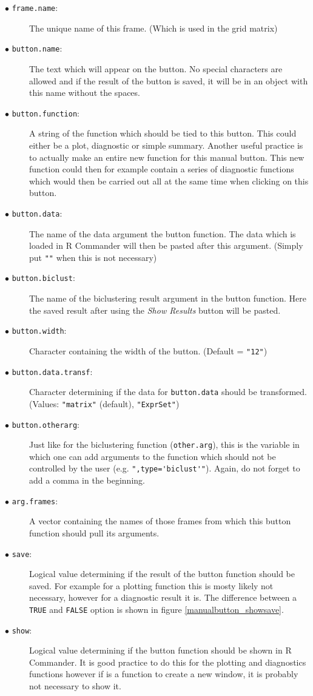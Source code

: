 \documentclass[a4paper]{article}\usepackage[]{graphicx}\usepackage[]{color}
\begin{document}
\begin{description}
  \item[$\bullet$ \texttt{frame.name}:] The unique name of this frame. (Which is used in the grid matrix)
  \item[$\bullet$ \texttt{button.name}:] The text which will appear on the
  button. No special characters are allowed and if the result of the button is
  saved, it will be in an object with this name without the spaces.
  \item[$\bullet$ \texttt{button.function}:] A string of the function which
  should be tied to this button. This could either be a plot, diagnostic or
  simple summary. Another useful practice is to actually make an entire
  new function for this manual button. This new function could then for
  example contain a series of diagnostic functions which would then be carried
  out all at the same time when clicking on this button.
  \item[$\bullet$ \texttt{button.data}:] The name of the data argument the
  button function. The data which is loaded in R Commander will then be
  pasted after this argument. (Simply put \verb|""| when this is not necessary)
  \item[$\bullet$ \texttt{button.biclust}:] The name of the biclustering result
  argument in the button function. Here the saved result after using the {\it
  Show Results} button will be pasted.
  \item[$\bullet$ \texttt{button.width}:] Character containing the width of the
  button. (Default = \verb|"12"|)
  \item[$\bullet$ \texttt{button.data.transf}:] Character determining if the
  data for \verb|button.data| should be transformed. (Values: \verb|"matrix"|
  (default), \verb|"ExprSet"|)
  \item[$\bullet$ \texttt{button.otherarg}:] Just like for the biclustering
  function (\verb|other.arg|), this is the variable in which one can add arguments to the
  function which should not be controlled by the user (e.g.
  \verb|",type='biclust'"|). Again, do not forget to add a comma in the
  beginning. 
  \item[$\bullet$ \texttt{arg.frames}:] A vector containing the names of those
  frames from which this button function should pull its arguments.
  \item[$\bullet$ \texttt{save}:] Logical value determining if the result of the
  button function should be saved. For example for a plotting function this is
  mosty likely not necessary, however for a diagnostic result it is. The
  difference between a \verb|TRUE| and \verb|FALSE| option is shown in figure
  \ref{manualbutton_showsave}.
  \item[$\bullet$ \texttt{show}:] Logical value determining if the button
  function should be shown in R Commander. It is good practice to do this for
  the plotting and diagnostics functions however if is a function to create a
  new window, it is probably not necessary to show it.

\end{description}
\end{document}
